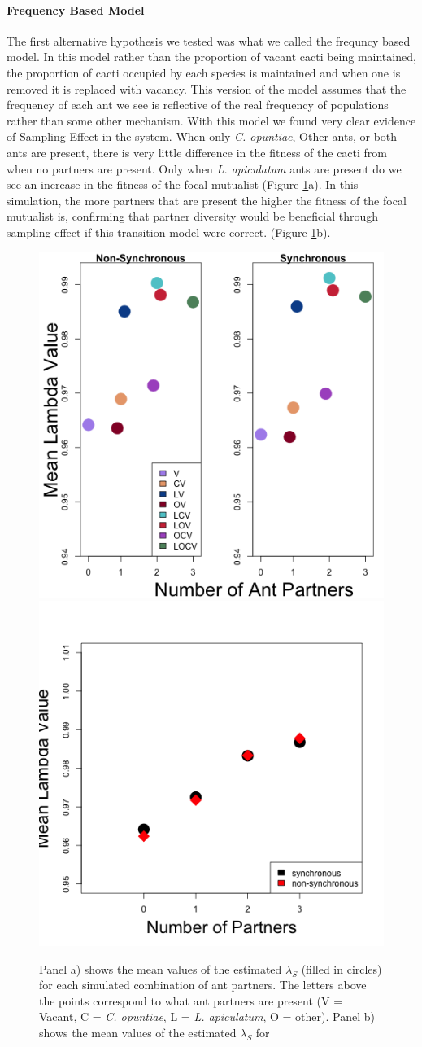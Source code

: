 \documentclass[11pt]{article}
\begin{document}
\paragraph{Frequency Based Model}
The first alternative hypothesis we tested was what we called the frequncy based model.
In this model rather than the proportion of vacant cacti being maintained, the proportion of cacti occupied by each species is maintained and when one is removed it is replaced with vacancy.
This version of the model assumes that the frequency of each ant we see is reflective of the real frequency of populations rather than some other mechanism.
With this model we found very clear evidence of Sampling Effect in the system. 
When only  \textit{C. opuntiae}, Other ants, or both ants are present, there is very little difference in the fitness of the cacti from when no partners are present. 
Only when \textit{L. apiculatum} ants are present do we see an increase in the fitness of the focal mutualist (Figure \ref{fig:FreqLambdaMeans}a).
In this simulation, the more partners that are present the higher the fitness of the focal mutualist is, confirming that partner diversity would be beneficial through sampling effect if this transition model were correct.  (Figure \ref{fig:FreqLambdaMeans}b).

\begin{figure}
\includegraphics[width=0.61\linewidth]{Figures/Lambdas_freq.png}
\includegraphics[width=0.39\linewidth]{Figures/freq_num_partners.png}
\caption{Panel a) shows the mean values of the estimated $\lambda_{S}$ (filled in circles) for each simulated combination of ant partners. The letters above the points correspond to what ant partners are present (V = Vacant, C = \textit{C. opuntiae}, L = \textit{L. apiculatum}, O = other). Panel b) shows the mean values of the estimated $\lambda_{S}$ for }
\label{fig:FreqLambdaMeans}
\end{figure}
\end{document}
